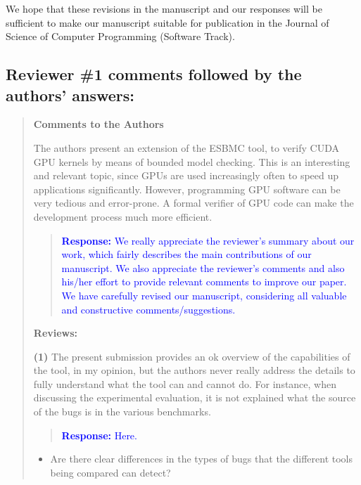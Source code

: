 \documentclass[11pt]{article}
\newcommand\vi{\vspace{\baselineskip}}
\begin{document}
\vi

We hope that these revisions in the manuscript and our responses will be sufficient to make our manuscript suitable for publication in the Journal of Science of Computer Programming (Software Track).

\newpage

\vi
\subsection*{Reviewer \#1 comments followed by the authors' answers:}

\begin{quote}

{\bf Comments to the Authors}

The authors present an extension of the ESBMC tool, to verify CUDA GPU kernels by means of bounded model checking. This is an interesting and relevant topic, since GPUs are used increasingly often to speed up applications significantly. However, programming GPU software can be very tedious and error-prone. A formal verifier of GPU code can make the development process much more efficient.

\begin{quote}
\textcolor{blue}{\textbf{Response:} We really appreciate the reviewer's summary about our work, which fairly describes the main contributions of our manuscript. We also appreciate the reviewer's comments and also his/her effort to provide relevant comments to improve our paper. We have carefully revised our manuscript, considering all valuable and constructive comments/suggestions.}
\end{quote}

{\bf Reviews:}

{\bf (1)} The present submission provides an ok overview of the capabilities of the tool, in my opinion, but the authors never really address the details to fully understand what the tool can and cannot do. For instance, when discussing the experimental evaluation, it is not explained what the source of the bugs is in the various benchmarks.

\begin{quote}
\textcolor{blue}{\textbf{Response:} Here.}
\end{quote}

  \begin{itemize}
  \item Are there clear differences in the types of bugs that the different tools being compared can detect?
  

\end{itemize}
\end{quote}
\end{document}
